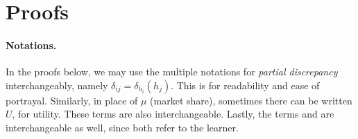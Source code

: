 \section{Proofs} \label{appx:proofs}
\paragraph{Notations.}
In the proofs below, we may use the multiple notations for \emph{partial discrepancy} interchangeably, namely $\delta_{ij} = \delta_{h_i}(h_j)$.
This is for readability and ease of portrayal.
Similarly, in place of $\mu$ (market share), sometimes there can be written $U$, for utility. These terms are also interchangeable. Lastly, the terms  and  are interchangeable as well, since both refer to the learner.
\\

